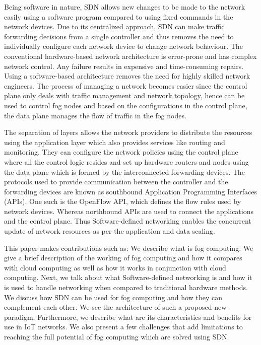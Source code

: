 \documentclass[conference]{IEEEtran}
\begin{document}
Being software in nature, SDN allows new changes to be made to the network easily using a software program compared to using fixed commands in the network devices. Due to its centralized approach, SDN can make traffic forwarding decisions from a single controller and thus removes the need to individually configure each network device to change network behaviour\cite{hkim}. The conventional hardware-based network architecture is error-prone and has complex network control. Any failure results in expensive and time-consuming repairs. Using a software-based architecture removes the need for highly skilled network engineers. The process of managing a network becomes easier since the control plane only deals with traffic management and network topology, hence can be used to control fog nodes and based on the configurations in the control plane, the data plane manages the flow of traffic in the fog nodes. 

The separation of layers allows the network providers to distribute the resources using the application layer which also provides services like routing and monitoring. They can configure the network policies using the control plane where all the control logic resides and set up hardware routers and nodes using the data plane which is formed by the interconnected forwarding devices.  The protocols used to provide communication between the controller and the forwarding devices are known as southbound Application Programming Interfaces (APIs). One such is the OpenFlow API, which defines the flow rules used by network devices. Whereas northbound APIs are used to connect the applications and the control plane. Thus Software-defined networking enables the concurrent update of network resources as per the application and data scaling.

This paper makes contributions such as: We describe what is fog computing. We give a brief description of the working of fog computing and how it compares with cloud computing as well as how it works in conjunction with cloud computing. Next, we talk about what Software-defined networking is and how it is used to handle networking when compared to traditional hardware methods. We discuss how SDN can be used for fog computing and how they can complement each other. We see the architecture of such a proposed new paradigm. Furthermore, we describe what are its characteristics and benefits for use in IoT networks. We also present a few challenges that add limitations to reaching the full potential of fog computing which are solved using SDN.
\end{document}
